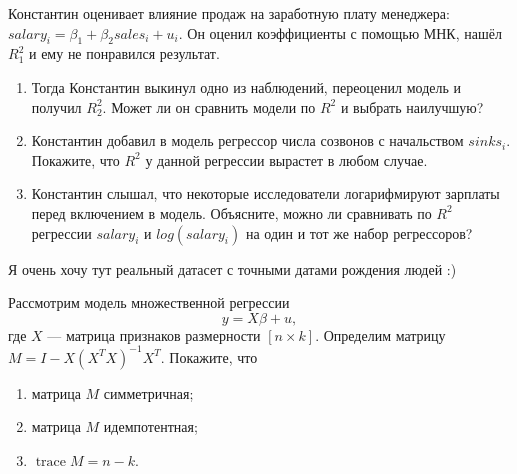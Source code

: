 \documentclass[12pt]{article}
\DeclareMathOperator{\trace}{trace}
\begin{document}
\begin{problem}

    Константин оценивает влияние продаж на заработную плату менеджера: $salary_i = \beta_1 + \beta_2 sales_i + u_i.$ Он оценил коэффициенты с помощью МНК, нашёл $R^2_1$ и ему не понравился результат. 

    \begin{enumerate}
        \item Тогда Константин выкинул одно из наблюдений, переоценил модель и получил $R^2_2$. Может ли он сравнить модели по $R^2$ и выбрать наилучшую?
        \item Константин добавил в модель регрессор числа созвонов с начальством $sinks_i$. Покажите, что $R^2$ у данной регрессии вырастет в любом случае.
        \item  Константин слышал, что некоторые исследователи логарифмируют зарплаты перед включением в модель. Объясните, можно ли сравнивать по $R^2$ регрессии $salary_i$ и $log(salary_i)$ на один и тот же набор регрессоров?
    \end{enumerate}
\end{problem}

\begin{problem}
    Я очень хочу тут реальный датасет с точными датами рождения людей :)
\end{problem}

\begin{problem}
    Рассмотрим модель множественной регрессии
    \[
    y = X\beta + u,
    \]
    где $X$ — матрица признаков размерности $[n \times k]$.
    Определим матрицу $M = I - X(X^TX)^{-1}X^T$. Покажите, что
    \begin{enumerate}
    \item матрица $M$ симметричная;
    \item матрица $M$ идемпотентная;
    \item $\trace M = n - k$.
    \end{enumerate}
\end{problem}
\end{document}
